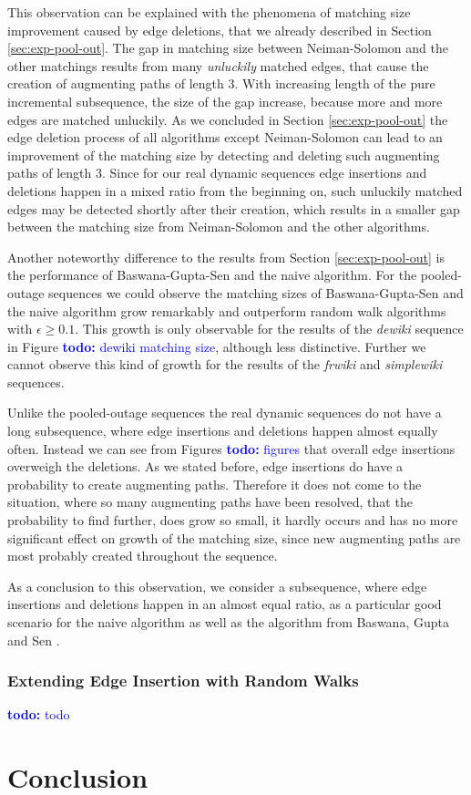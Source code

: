 \documentclass{article}      %
\newcommand\todo[1]{\textcolor{blue}{\textbf{todo: }#1}}
\begin{document}
This observation can be explained with the phenomena of matching size improvement caused by edge deletions, that we already described in Section \ref{sec:exp-pool-out}. The gap in matching size between Neiman-Solomon and the other matchings results from many \emph{unluckily} matched edges, that cause the creation of augmenting paths of length 3. With increasing length of the pure incremental subsequence, the size of the gap increase, because more and more edges are matched unluckily. As we concluded in Section \ref{sec:exp-pool-out} the edge deletion process of all algorithms except Neiman-Solomon can lead to an improvement of the matching size by detecting and deleting such augmenting paths of length 3. Since for our real dynamic sequences edge insertions and deletions happen in a mixed ratio from the beginning on, such unluckily matched edges may be detected shortly after their creation, which results in a smaller gap between the matching size from Neiman-Solomon and the other algorithms.

\bigskip
\noindent
Another noteworthy difference to the results from Section \ref{sec:exp-pool-out} is the performance of Baswana-Gupta-Sen and the naive algorithm. For the pooled-outage sequences we could observe the matching sizes of Baswana-Gupta-Sen and the naive algorithm grow remarkably and outperform random walk algorithms with $\epsilon \geq 0.1$. This growth is only observable for the results of the \emph{dewiki} sequence in Figure \todo{dewiki matching size}, although less distinctive. Further we cannot observe this kind of growth for the results of the \emph{frwiki} and \emph{simplewiki} sequences. 

Unlike the pooled-outage sequences the real dynamic sequences do not have a long subsequence, where edge insertions and deletions happen almost equally often. Instead we can see from Figures \todo{figures} that overall edge insertions overweigh the deletions. As we stated before, edge insertions do have a probability to create augmenting paths. Therefore it does not come to the situation, where so many augmenting paths have been resolved, that the probability to find further, does grow so small, it hardly occurs and has no more significant effect on growth of the matching size, since new augmenting paths are most probably created throughout the sequence.

As a conclusion to this observation, we consider a subsequence, where edge insertions and deletions happen in an almost equal ratio, as a particular good scenario for the naive algorithm as well as the algorithm from Baswana, Gupta and Sen \cite{bgs}.

\subsubsection{Extending Edge Insertion with Random Walks}

\todo{todo}

\pagebreak
\section{Conclusion}
\label{sec:conclusion}

\pagebreak



\end{document}
